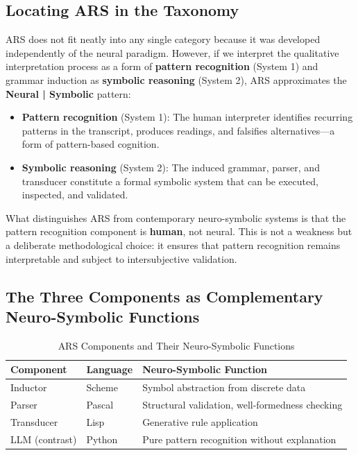 \documentclass[12pt,a4paper]{article}
\begin{document}
\subsection{Locating ARS in the Taxonomy}

ARS does not fit neatly into any single category because it was developed 
independently of the neural paradigm. However, if we interpret the qualitative 
interpretation process as a form of \textbf{pattern recognition} (System 1) and 
grammar induction as \textbf{symbolic reasoning} (System 2), ARS approximates 
the \textbf{Neural | Symbolic} pattern:

\begin{itemize}
    \item \textbf{Pattern recognition} (System 1): The human interpreter 
    identifies recurring patterns in the transcript, produces readings, and 
    falsifies alternatives—a form of pattern-based cognition.
    \item \textbf{Symbolic reasoning} (System 2): The induced grammar, parser, 
    and transducer constitute a formal symbolic system that can be executed, 
    inspected, and validated.
\end{itemize}

What distinguishes ARS from contemporary neuro-symbolic systems is that the 
pattern recognition component is \textbf{human}, not neural. This is not a 
weakness but a deliberate methodological choice: it ensures that pattern 
recognition remains interpretable and subject to intersubjective validation.

\subsection{The Three Components as Complementary Neuro-Symbolic Functions}

\begin{table}[H]
\centering
\caption{ARS Components and Their Neuro-Symbolic Functions}
\label{tab:components}
\begin{tabular}{@{} p{3cm} p{4cm} p{6cm} @{}}
\toprule
\textbf{Component} & \textbf{Language} & \textbf{Neuro-Symbolic Function} \\
\midrule
Inductor & Scheme & Symbol abstraction from discrete data \\
Parser & Pascal & Structural validation, well-formedness checking \\
Transducer & Lisp & Generative rule application \\
LLM (contrast) & Python & Pure pattern recognition without explanation \\
\bottomrule
\end{tabular}
\end{table}
\end{document}
